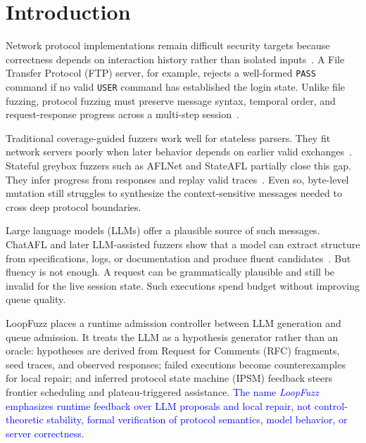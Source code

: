 \documentclass[final,5p,times,number]{elsarticle}
\begin{document}
\section{Introduction}
Network protocol implementations remain difficult security targets because correctness depends on interaction history rather than isolated inputs~\cite{aflnet,stateafl,sgf_usenix22,formatted_stateful_greybox_fuzzing_2024,resolverfuzz_query_response_2024}. A File Transfer Protocol (FTP) server, for example, rejects a well-formed \texttt{PASS} command if no valid \texttt{USER} command has established the login state. Unlike file fuzzing, protocol fuzzing must preserve message syntax, temporal order, and request-response progress across a multi-step session~\cite{resolverfuzz_query_response_2024,mbfuzzer_mqtt_2025,bleem_packet_sequence_2023,logos_log_guided_fuzzing_2024,diane_identifying_fuzzing_triggers_2021,corecrisis_context_aware_2025}.

Traditional coverage-guided fuzzers work well for stateless parsers. They fit network servers poorly when later behavior depends on earlier valid exchanges~\cite{directed_greybox_fuzzing_2017,seed_selection_successful_fuzzing_2021,one_fuzzing_strategy_rule_2022,regression_greybox_fuzzing_2021,efficient_errors_2022}. Stateful greybox fuzzers such as AFLNet and StateAFL partially close this gap. They infer progress from responses and replay valid traces~\cite{aflnet,stateafl,sgf_usenix22,profuzzbench_benchmark_stateful_protocol_2021,snapfuzz_high_throughput_fuzzing_2022,bleem_packet_sequence_2023,formatted_stateful_greybox_fuzzing_2024}. Even so, byte-level mutation still struggles to synthesize the context-sensitive messages needed to cross deep protocol boundaries.

Large language models (LLMs) offer a plausible source of such messages. ChatAFL and later LLM-assisted fuzzers show that a model can extract structure from specifications, logs, or documentation and produce fluent candidates~\cite{chatafl,fuzz4all_universal_fuzzing_large_2024,llmif_augmented_large_language_2024,matter_llm_specification_2024,carpetfuzz_documentation_2023,prompt_fuzzing_fuzz_driver_2024,large_language_models_are_2023,large_language_models_are_2024}. But fluency is not enough. A request can be grammatically plausible and still be invalid for the live session state. Such executions spend budget without improving queue quality.

LoopFuzz places a runtime admission controller between LLM generation and queue admission. It treats the LLM as a hypothesis generator rather than an oracle: hypotheses are derived from Request for Comments (RFC) fragments, seed traces, and observed responses; failed executions become counterexamples for local repair; and inferred protocol state machine (IPSM) feedback steers frontier scheduling and plateau-triggered assistance. \textcolor{blue}{The name \emph{LoopFuzz} emphasizes runtime feedback over LLM proposals and local repair, not control-theoretic stability, formal verification of protocol semantics, model behavior, or server correctness.}
\end{document}
